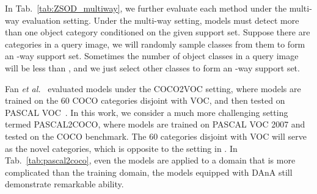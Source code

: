\documentclass[journal]{IEEEtran}
\newcommand{\etal}{\textit{et al.}}
\begin{document}
\begin{table}[t!]
    \centering
    \caption{
    Following \cite{karlinsky2019repmet}, we construct class-balanced episodes from COCO for evaluation. In addition, we report the performance of two different detection networks adopting the proposed DAnA component. Even though the performance of DAnA-RetinaNet is less remarkable than DAnA-FasterRCNN, it still significantly outperforms the baselines which are based on Faster R-CNN, showing the effectiveness of our proposed attention mechanism.
    }
    \label{tab:episode}
\end{table}


In Tab.~\ref{tab:ZSOD_multiway}, we further evaluate each method under the multi-way evaluation setting.
Under the multi-way setting, models must detect more than one object category conditioned on the given support set. 
Suppose there are  categories in a query image, we will randomly sample  classes from them to form an -way support set.
Sometimes the number of object classes in a query image will be less than , and we just select other  classes to form an -way support set.



Fan \etal~\cite{fan2020fgn} evaluated models under the COCO2VOC setting, where models are trained on the 60 COCO categories disjoint with VOC, and then tested on PASCAL VOC~\cite{everingham2010pascal}.
In this work, we consider a much more challenging setting termed PASCAL2COCO, where models are trained on PASCAL VOC 2007 and tested on the COCO benchmark.
The 60 categories disjoint with VOC will serve as the novel categories, which is opposite to the setting in \cite{fan2020fgn}. 
In Tab.~\ref{tab:pascal2coco}, even the models are applied to a domain that is more complicated than the training domain, the models equipped with DAnA still demonstrate remarkable ability.
\end{document}
